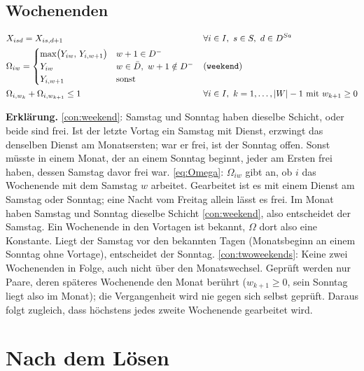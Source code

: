 \documentclass[11pt]{combiArticle}
\newcommand{\Dm}{D^{-}}
\newcommand{\Db}{\bar{D}}
\newcommand{\code}[1]{\texttt{#1}}
\begin{document}
\subsection{Wochenenden}

\begin{align}
  & X_{isd} = X_{is,d+1} && \forall i \in I,\ s \in S,\ d \in D^{Sa} \label{con:weekend}\\
  & \Omega_{iw} = \begin{cases}
      \max\bigl(Y_{iw},\, Y_{i,w+1}\bigr) & w+1 \in \Dm\\
      Y_{iw} & w \in \Db,\ w+1 \notin \Dm\\
      Y_{i,w+1} & \text{sonst}
    \end{cases} && \text{(\code{weekend})} \label{eq:Omega}\\
  & \Omega_{i,w_k} + \Omega_{i,w_{k+1}} \le 1 && \forall i \in I,\ k = 1,\dots,|W|-1 \text{ mit } w_{k+1} \ge 0
    \label{con:twoweekends}
\end{align}

\textbf{Erklärung.}
\eqref{con:weekend}: Samstag und Sonntag haben dieselbe Schicht, oder beide sind frei. Ist der letzte Vortag
ein Samstag mit Dienst, erzwingt das denselben Dienst am Monatsersten; war er frei, ist der Sonntag offen. Sonst
müsste in einem Monat, der an einem Sonntag beginnt, jeder am Ersten frei haben, dessen Samstag davor frei war.
\eqref{eq:Omega}: $\Omega_{iw}$ gibt an, ob $i$ das Wochenende mit dem Samstag $w$ arbeitet. Gearbeitet ist es
mit einem Dienst am Samstag oder Sonntag; eine Nacht vom Freitag allein lässt es frei. Im Monat haben Samstag
und Sonntag dieselbe Schicht \eqref{con:weekend}, also entscheidet der Samstag. Ein Wochenende in den Vortagen
ist bekannt, $\Omega$ dort also eine Konstante. Liegt der Samstag vor den bekannten Tagen (Monatsbeginn an einem
Sonntag ohne Vortage), entscheidet der Sonntag.
\eqref{con:twoweekends}: Keine zwei Wochenenden in Folge, auch nicht über den Monatswechsel. Geprüft werden nur
Paare, deren späteres Wochenende den Monat berührt ($w_{k+1} \ge 0$, sein Sonntag liegt also im Monat); die
Vergangenheit wird nie gegen sich selbst geprüft. Daraus
folgt zugleich, dass höchstens jedes zweite Wochenende gearbeitet wird.

\section{Nach dem Lösen}
\end{document}
